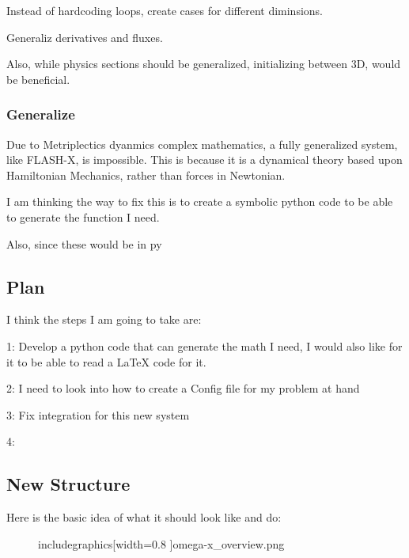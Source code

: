 Instead of hardcoding loops, create cases for different diminsions.


Generaliz derivatives and fluxes.

Also, while physics sections should be generalized, initializing between 3D, would be beneficial.
\subsubsection{Generalize}
Due to Metriplectics dyanmics complex mathematics, a fully generalized system, like FLASH-X, is impossible. This is because it is a dynamical theory based upon Hamiltonian Mechanics, rather than forces in Newtonian.

I am thinking the way to fix this is to create a symbolic python code to be able to generate the function I need.

Also, since these would be in py
\subsection{Plan}

I think the steps I am going to take are:

1: Develop a python code that can generate the math I need, I would also like for it to be able to read a LaTeX code for it.

2: I need to look into how to create a Config file for my problem at hand

3: Fix integration for this new system

4: 
\subsection{New Structure}
Here is the basic idea of what it should look like and do:
\begin{figure}[h]
	\centering
	includegraphics[width=0.8 \textwidth]{omega-x_overview.png}
\end{figure}

